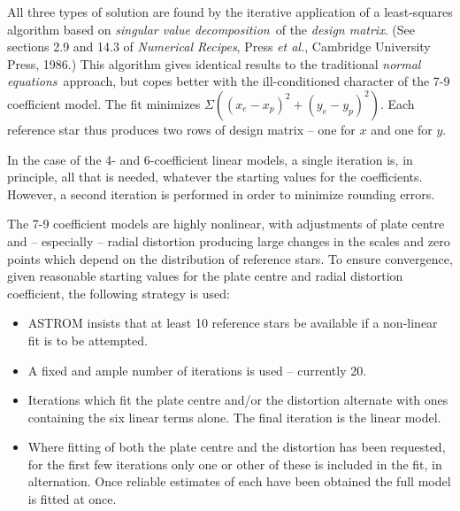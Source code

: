 All three types of solution are found by the iterative application of a
least-squares
algorithm based on {\it singular value decomposition}\, of the {\it design
matrix}.  (See sections 2.9 and 14.3 of {\it Numerical Recipes},
Press {\it et al.}, Cambridge University Press, 1986.)
This algorithm gives identical results to the traditional
{\it normal equations}\,
approach, but copes better with the ill-conditioned character of the
7-9 coefficient model.
The fit minimizes $\Sigma ((x_{e}-x_{p})^{2}+(y_{e}-y_{p})^{2})$.
Each reference star thus produces two rows of design matrix -- one for
$x$ and one for $y$.

In the case of the 4- and 6-coefficient linear models, a single iteration
is, in principle, all that is needed, whatever the starting values for
the coefficients.  However, a second iteration is performed in order to
minimize rounding errors.

The 7-9 coefficient models are highly nonlinear, with adjustments
of plate centre and -- especially -- radial distortion producing
large changes in the scales and zero points which depend on the
distribution of reference stars.  To ensure convergence, given
reasonable starting values for the plate centre and radial
distortion coefficient, the following strategy is used:
\begin{itemize}
 \item ASTROM insists that at least 10 reference stars be available
       if a non-linear fit is to be attempted.
 \item A fixed and ample number of iterations is used -- currently 20.
 \item Iterations which fit the plate centre and/or the distortion
       alternate with ones containing the six linear terms alone.
       The final iteration is the linear model.
 \item Where fitting of both the plate centre and the distortion
       has been requested, for the first few iterations only one
       or other of these is included in the fit, in alternation.
       Once reliable estimates of each have been obtained the full
       model is fitted at once.
\end{itemize}

